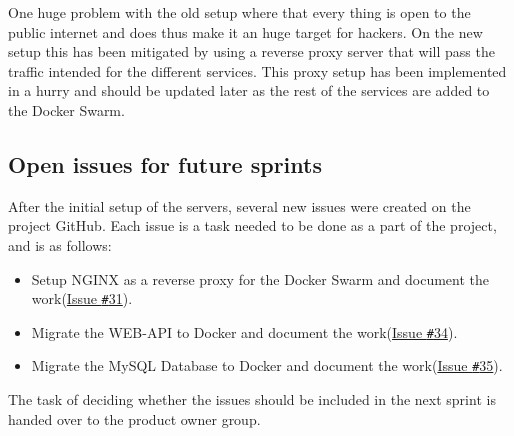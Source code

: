 One huge problem with the old setup where that every thing is open to the public internet and does thus make it an huge target for hackers. 
On the new setup this has been mitigated by using a reverse proxy server that will pass the traffic intended for the different services. 
This proxy setup has been implemented in a hurry and should be updated later as the rest of the services are added to the Docker Swarm. 

\subsection{Open issues for future sprints}
After the initial setup of the servers, several new issues were created on the project GitHub. 
Each issue is a task needed to be done as a part of the project, and is as follows:

\begin{itemize}
\item Setup NGINX as a reverse proxy for the Docker Swarm and document the work(\href{https://github.com/aau-giraf/wiki/issues/31}{Issue \texttt{\#}31}).
\item Migrate the WEB-API to Docker and document the work(\href{https://github.com/aau-giraf/wiki/issues/34}{Issue \texttt{\#}34}).
\item Migrate the MySQL Database to Docker and document the work(\href{https://github.com/aau-giraf/wiki/issues/35}{Issue \texttt{\#}35}).
\end{itemize}

The task of deciding whether the issues should be included in the next sprint is handed over to the product owner group.
